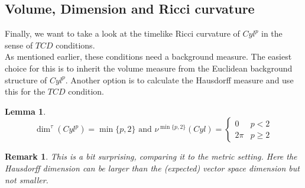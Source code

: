 \documentclass[11pt, a4paper]{article} %
\newtheorem{lemma}[definition]{Lemma}
\theoremstyle{plain} %
\newtheorem{remark}{Remark}
\begin{document}
\subsection{Volume, Dimension and Ricci curvature}
Finally, we want to take a look at the timelike Ricci curvature of $Cyl^p$ in the sense of $TCD$ conditions. \\
As mentioned earlier, these conditions need a background measure. The easiest choice for this is to inherit the volume measure from the Euclidean background structure of $Cyl^p$. Another option is to calculate the Hausdorff measure and use this for the $TCD$ condition.
\begin{lemma}
\begin{equation*}
    \dim^\tau(Cyl^p) = \min\{p,2\} \text{  and  } \nu^{ \min\{p,2\}}(Cyl)=\begin{cases}
        0 & p<2\\
        2 \pi & p\geq 2
    \end{cases}
\end{equation*}
\end{lemma}
\begin{remark}
    This is a bit surprising, comparing it to the metric setting. Here the Hausdorff dimension can be larger than the (expected) vector space dimension but not smaller.
\end{remark}
\end{document}

